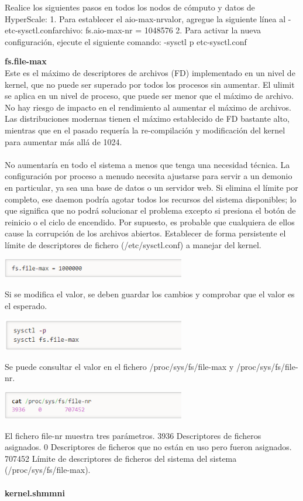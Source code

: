 Realice los siguientes pasos en todos los nodos de cómputo y datos de HyperScale:
1.	Para establecer el aio-max-nrvalor, agregue la siguiente línea al -etc-sysctl.confarchivo:
 fs.aio-max-nr = 1048576
2.	Para activar la nueva configuración, ejecute el siguiente comando:
 -sysctl p etc-sysctl.conf
 
\newpage

{\bfseries fs.file-max}\\

Este es el máximo de descriptores de archivos (FD) implementado en un nivel de kernel, que no puede ser superado por todos los procesos sin aumentar. El ulimit se aplica en un nivel de proceso, que puede ser menor que el máximo de archivo. No hay riesgo de impacto en el rendimiento al aumentar el máximo de archivos. Las distribuciones modernas tienen el máximo establecido de FD bastante alto, mientras que en el pasado requería la re-compilación y modificación del kernel para aumentar más allá de 1024. \\ \\
No aumentaría en todo el sistema a menos que tenga una necesidad técnica. La configuración por proceso a menudo necesita ajustarse para servir a un demonio en particular, ya sea una base de datos o un servidor web. 
Si elimina el límite por completo, ese daemon podría agotar todos los recursos del sistema disponibles; lo que significa que no podrá solucionar el problema excepto si presiona el botón de reinicio o el ciclo de encendido. Por supuesto, es probable que cualquiera de ellos cause la corrupción de los archivos abiertos.
Establecer de forma persistente el límite de descriptores de fichero (/etc/sysctl.conf) a manejar del kernel.
	\begin{center}
		\includegraphics[width=8cm]{./Imagenes/fsFileE1} 
	\end{center}
Si se modifica el valor, se deben guardar los cambios y comprobar que el valor es el esperado.
	\begin{center}
		\includegraphics[width=8cm]{./Imagenes/fsFileE2} 
	\end{center}
Se puede consultar el valor en el fichero /proc/sys/fs/file-max y /proc/sys/fs/file-nr.
	\begin{center}
		\includegraphics[width=8cm]{./Imagenes/fsFileE3} 
	\end{center}
El fichero file-nr muestra tres parámetros. 3936 Descriptores de ficheros asignados. 0 Descriptores de ficheros que no están en uso pero fueron asignados. 707452 Límite de descriptores de ficheros del sistema del sistema (/proc/sys/fs/file-max).\\ \\
{\bfseries kernel.shmmni}\\

